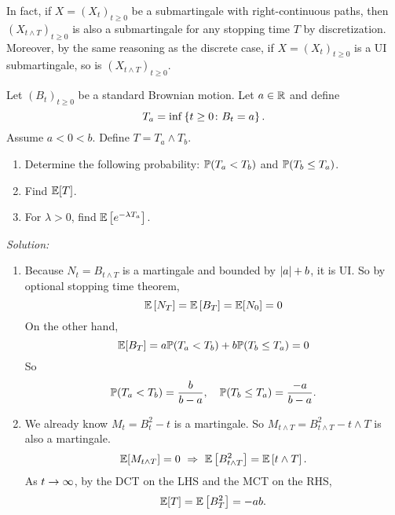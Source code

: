 \begin{rmk}
    In fact, if $X = (X_t)_{t \geq 0}$ be a submartingale with right-continuous paths, then $(X_{t \wedge T})_{t \geq 0}$ is also a submartingale for any stopping time $T$ by discretization. Moreover, by the same reasoning as the discrete case, if $X = (X_t)_{t \geq 0}$ is a UI submartingale, so is $(X_{t \wedge T})_{t \geq 0}$.
\end{rmk}

\begin{exam}
    Let $(B_t)_{t \geq 0}$ be a standard Brownian motion. Let $a \in \mathbb{R}$ and define
    \begin{equation*}
        T_a = \inf\left\{t \geq 0\colon B_t = a\right\}.
    \end{equation*}
    Assume $a < 0 < b$. Define $T = T_a \wedge T_b$.
    \begin{enumerate}[label=(\arabic{*})]
        \item Determine the following probability: $\mathbb{P}(T_a < T_b)$ and $\mathbb{P}(T_b \leq T_a)$.
        \item Find $\mathbb{E}[T]$.
        \item For $\lambda > 0$, find $\mathbb{E}\left[e^{-\lambda T_a}\right]$.
    \end{enumerate}
    \noindent \emph{Solution:} 
    \begin{enumerate}[label=(\arabic{*})]
        \item Because $N_t = B_{t \wedge T}$ is a martingale and bounded by $\left\lvert a\right\lvert+b$, it is UI. So by optional stopping time theorem,
        \begin{equation*}
            \mathbb{E}\left[N_T\right] = \mathbb{E}\left[B_T\right] = \mathbb{E}[N_0] = 0
        \end{equation*}
        On the other hand,
        \begin{equation*}
            \mathbb{E}[B_T] = a\mathbb{P}(T_a < T_b) + b \mathbb{P}(T_b \leq T_a) = 0
        \end{equation*}
        So
        \begin{equation*}
            \mathbb{P}(T_a < T_b) = \frac{b}{b-a},\quad \mathbb{P}(T_b \leq T_a) = \frac{-a}{b-a}.
        \end{equation*}

        \item We already know $M_t = B_t^2 - t$ is a martingale. So $M_{t \wedge T} = B^2_{t\wedge T} - t \wedge T$ is also a martingale. 
        \begin{equation*}
            \mathbb{E}[M_{t \wedge T}] = 0~\Rightarrow~ \mathbb{E}\left[B^2_{t\wedge T}\right] = \mathbb{E}\left[t \wedge T\right].
        \end{equation*}
        As $t \rightarrow \infty$, by the DCT on the LHS and the MCT on the RHS,
        \begin{equation*}
            \mathbb{E}[T] = \mathbb{E}\left[B_T^2\right] = -ab.
        \end{equation*}


\end{enumerate}
\end{exam}
